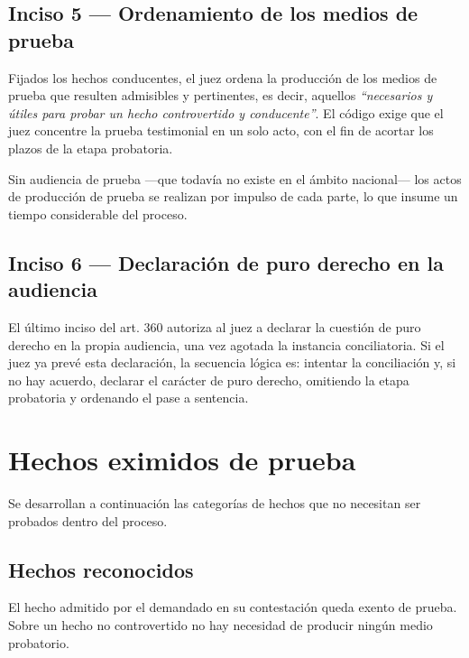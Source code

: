 \documentclass[12pt,oneside]{book}
\begin{document}
\section{Inciso 5 --- Ordenamiento de los medios de prueba}

Fijados los hechos conducentes, el juez ordena la producción de los medios de prueba que resulten admisibles y pertinentes, es decir, aquellos \textit{“necesarios y útiles para probar un hecho controvertido y conducente”}. El código exige que el juez concentre la prueba testimonial en un solo acto, con el fin de acortar los plazos de la etapa probatoria.

\begin{note}
Sin audiencia de prueba —que todavía no existe en el ámbito nacional— los actos de producción de prueba se realizan por impulso de cada parte, lo que insume un tiempo considerable del proceso.
\end{note}

\section{Inciso 6 --- Declaración de puro derecho en la audiencia}

El último inciso del art. 360 autoriza al juez a declarar la cuestión de puro derecho en la propia audiencia, una vez agotada la instancia conciliatoria. Si el juez ya prevé esta declaración, la secuencia lógica es: intentar la conciliación y, si no hay acuerdo, declarar el carácter de puro derecho, omitiendo la etapa probatoria y ordenando el pase a sentencia.

\chapter{Hechos eximidos de prueba}

Se desarrollan a continuación las categorías de hechos que no necesitan ser probados dentro del proceso.

\section{Hechos reconocidos}

El hecho admitido por el demandado en su contestación queda exento de prueba. Sobre un hecho no controvertido no hay necesidad de producir ningún medio probatorio.
\end{document}
